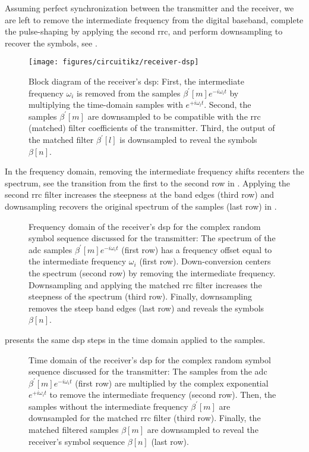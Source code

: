 Assuming perfect synchronization between the transmitter and the receiver, we are left to remove the intermediate frequency from the digital baseband, complete the pulse-shaping by applying the second \gls{rrc}, and perform downsampling to recover the symbols, see .
\begin{figure}[htb]
	\centering
	\texttt{[image: figures/circuitikz/receiver-dsp]}
	\caption{Block diagram of the receiver's \gls{dsp}: First, the intermediate frequency $\omega_i$ is removed from the samples $\beta^\prime[m]e^{-i\omega_it}$ by multiplying the time-domain samples with $e^{+i\omega_lt}$. Second, the samples $\beta^\prime[m]$ are downsampled to be compatible with the \gls{rrc} (matched) filter coefficients of the transmitter. Third, the output of the matched filter $\beta^\prime[l]$ is downsampled to reveal the symbols $\beta[n]$.}\label{fig:receiver_dsp}
\end{figure}
In the frequency domain, removing the intermediate frequency shifts recenters the spectrum, see the transition from the first to the second row in .
Applying the second \gls{rrc} filter increases the steepness at the band edges (third row) and downsampling recovers the original spectrum of the samples (last row) in .
\begin{figure}[htb]
	\centering
	
	\caption{Frequency domain of the receiver's \gls{dsp} for the complex random symbol sequence discussed for the transmitter: The spectrum of the \gls{adc} samples $\beta^\prime[m]e^{-i\omega_it}$ (first row) has a frequency offset equal to the intermediate frequency $\omega_i$ (first row). Down-conversion centers the spectrum (second row) by removing the intermediate frequency. Downsampling and applying the matched \gls{rrc} filter increases the steepness of the spectrum (third row). Finally, downsampling removes the steep band edges (last row) and reveals the symbols $\beta[n]$.}\label{fig:receiver_frequency}
\end{figure}
 presents the same \gls{dsp} steps in the time domain applied to the samples.
\begin{figure}[htb]
	\centering
	
	\caption{Time domain of the receiver's \gls{dsp} for the complex random symbol sequence discussed for the transmitter: The samples from the \gls{adc} $\beta^\prime[m]e^{-i\omega_it}$ (first row) are multiplied by the complex exponential $e^{+i\omega_it}$ to remove the intermediate frequency (second row). Then, the samples without the intermediate frequency $\beta^\prime[m]$ are downsampled for the matched \gls{rrc} filter (third row). Finally, the matched filtered samples $\beta[m]$ are downsampled to reveal the receiver's symbol sequence $\beta[n]$ (last row).}\label{fig:receiver_time}
\end{figure}

